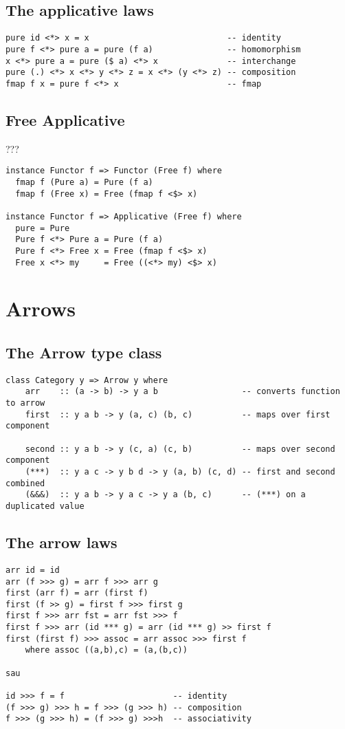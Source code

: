 \documentclass[12pt,twoside]{report}
\begin{document}
\subsection{The applicative laws}
\begin{verbatim}
pure id <*> x = x                            -- identity
pure f <*> pure a = pure (f a)               -- homomorphism
x <*> pure a = pure ($ a) <*> x              -- interchange
pure (.) <*> x <*> y <*> z = x <*> (y <*> z) -- composition
fmap f x = pure f <*> x                      -- fmap
\end{verbatim}

\subsection{Free Applicative}
???
\begin{verbatim}
instance Functor f => Functor (Free f) where
  fmap f (Pure a) = Pure (f a)
  fmap f (Free x) = Free (fmap f <$> x)

instance Functor f => Applicative (Free f) where
  pure = Pure
  Pure f <*> Pure a = Pure (f a)
  Pure f <*> Free x = Free (fmap f <$> x)
  Free x <*> my     = Free ((<*> my) <$> x)
\end{verbatim}
\section{Arrows}
\subsection{The Arrow type class}
\begin{verbatim}
class Category y => Arrow y where
    arr    :: (a -> b) -> y a b                 -- converts function to arrow
    first  :: y a b -> y (a, c) (b, c)          -- maps over first component

    second :: y a b -> y (c, a) (c, b)          -- maps over second component
    (***)  :: y a c -> y b d -> y (a, b) (c, d) -- first and second combined
    (&&&)  :: y a b -> y a c -> y a (b, c)      -- (***) on a duplicated value
\end{verbatim}

\subsection{The arrow laws}
\begin{verbatim}
arr id = id
arr (f >>> g) = arr f >>> arr g
first (arr f) = arr (first f)
first (f >> g) = first f >>> first g
first f >>> arr fst = arr fst >>> f
first f >>> arr (id *** g) = arr (id *** g) >> first f
first (first f) >>> assoc = arr assoc >>> first f
    where assoc ((a,b),c) = (a,(b,c))

sau

id >>> f = f                      -- identity
(f >>> g) >>> h = f >>> (g >>> h) -- composition
f >>> (g >>> h) = (f >>> g) >>>h  -- associativity
\end{verbatim}
\end{document}
